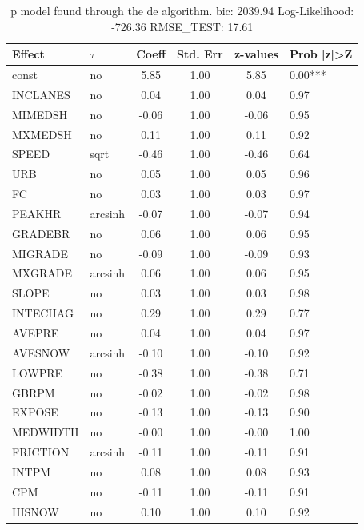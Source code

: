 \begin{table}
	\caption{p model found through the de algorithm. bic: 2039.94 Log-Likelihood: -726.36 RMSE_TEST: 17.61}
	\begin{center}
		\begin{tabular}{|l|l|c|c|c|l|}
			\hline
			Effect & $\tau$ & Coeff & Std. Err & z-values & Prob |z|>Z \\
			\hline
			const & no & 5.85 & 1.00 & 5.85 & 0.00*** \\
			\hline
			INCLANES & no & 0.04 & 1.00 & 0.04 & 0.97 \\
			\hline
			MIMEDSH & no & -0.06 & 1.00 & -0.06 & 0.95 \\
			\hline
			MXMEDSH & no & 0.11 & 1.00 & 0.11 & 0.92 \\
			\hline
			SPEED & sqrt & -0.46 & 1.00 & -0.46 & 0.64 \\
			\hline
			URB & no & 0.05 & 1.00 & 0.05 & 0.96 \\
			\hline
			FC & no & 0.03 & 1.00 & 0.03 & 0.97 \\
			\hline
			PEAKHR & arcsinh & -0.07 & 1.00 & -0.07 & 0.94 \\
			\hline
			GRADEBR & no & 0.06 & 1.00 & 0.06 & 0.95 \\
			\hline
			MIGRADE & no & -0.09 & 1.00 & -0.09 & 0.93 \\
			\hline
			MXGRADE & arcsinh & 0.06 & 1.00 & 0.06 & 0.95 \\
			\hline
			SLOPE & no & 0.03 & 1.00 & 0.03 & 0.98 \\
			\hline
			INTECHAG & no & 0.29 & 1.00 & 0.29 & 0.77 \\
			\hline
			AVEPRE & no & 0.04 & 1.00 & 0.04 & 0.97 \\
			\hline
			AVESNOW & arcsinh & -0.10 & 1.00 & -0.10 & 0.92 \\
			\hline
			LOWPRE & no & -0.38 & 1.00 & -0.38 & 0.71 \\
			\hline
			GBRPM & no & -0.02 & 1.00 & -0.02 & 0.98 \\
			\hline
			EXPOSE & no & -0.13 & 1.00 & -0.13 & 0.90 \\
			\hline
			MEDWIDTH & no & -0.00 & 1.00 & -0.00 & 1.00 \\
			\hline
			FRICTION & arcsinh & -0.11 & 1.00 & -0.11 & 0.91 \\
			\hline
			INTPM & no & 0.08 & 1.00 & 0.08 & 0.93 \\
			\hline
			CPM & no & -0.11 & 1.00 & -0.11 & 0.91 \\
			\hline
			HISNOW & no & 0.10 & 1.00 & 0.10 & 0.92 \\

\end{tabular}
\end{center}
\end{table}
